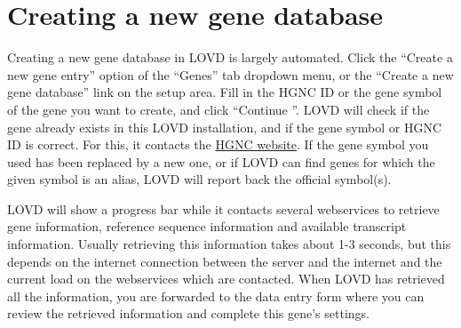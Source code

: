 \documentclass[a4paper,oneside,openany,12pt]{memoir}
\renewenvironment{leftbar}[1][\hsize]
{%
    \def\FrameCommand
    {%
        {\color{LOVDdark}\vrule width 3pt \hspace{5pt}}%
        \colorbox{LOVDlight}%
    }%
    \MakeFramed{\hsize#1\advance\hsize-\width\FrameRestore}%
}
{\endMakeFramed}
\begin{document}
\section{Creating a new gene database}
Creating a new gene database in LOVD is largely automated.
Click the ``Create a new gene entry'' option of the ``Genes'' tab dropdown menu, or the ``Create a new gene database'' link on the setup area.
Fill in the HGNC ID or the gene symbol of the gene you want to create, and click ``Continue \guillemotright''.
LOVD will check if the gene already exists in this LOVD installation, and if the gene symbol or HGNC ID is correct.
For this, it contacts the \href{http://www.genenames.org/}{HGNC website}.
If the gene symbol you used has been replaced by a new one, or if LOVD can find genes for which the given symbol is an alias, LOVD will report back the official symbol(s).
\\
\par
LOVD will show a progress bar while it contacts several webservices to retrieve gene information, reference sequence information and available transcript information.
Usually retrieving this information takes about 1-3 seconds, but this depends on the internet connection between
the server and the internet and the current load on the webservices which are contacted.
When LOVD has retrieved all the information, you are forwarded to the data entry form where you can review the retrieved information and complete this gene's settings.
\end{document}
